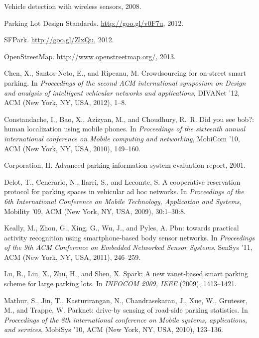 \documentclass{sigchi}
\begin{document}
\balance
{\footnotesize
\begin{thebibliography}{10}

Vehicle detection with wireless sensors, 2008.

{Parking Lot Design Standards}.
\newblock \url{http://goo.gl/v0F7u}, 2012.

{SFPark}.
\newblock \url{http://goo.gl/ZlxQu}, 2012.

{OpenStreetMap}.
\newblock \url{http://www.openstreetmap.org/}, 2013.

Chen, X., Santos-Neto, E., and Ripeanu, M.
\newblock Crowdsourcing for on-street smart parking.
\newblock In {\em Proceedings of the second ACM international symposium on
  Design and analysis of intelligent vehicular networks and applications},
  DIVANet '12, ACM (New York, NY, USA, 2012), 1--8.

Constandache, I., Bao, X., Azizyan, M., and Choudhury, R.~R.
\newblock Did you see bob?: human localization using mobile phones.
\newblock In {\em Proceedings of the sixteenth annual international conference
  on Mobile computing and networking}, MobiCom '10, ACM (New York, NY, USA,
  2010), 149--160.

Corporation, H.
\newblock Advanced parking information system evaluation report, 2001.

Delot, T., Cenerario, N., Ilarri, S., and Lecomte, S.
\newblock A cooperative reservation protocol for parking spaces in vehicular ad
  hoc networks.
\newblock In {\em Proceedings of the 6th International Conference on Mobile
  Technology, Application and Systems}, Mobility '09, ACM (New York, NY, USA,
  2009), 30:1--30:8.

Keally, M., Zhou, G., Xing, G., Wu, J., and Pyles, A.
\newblock Pbn: towards practical activity recognition using smartphone-based
  body sensor networks.
\newblock In {\em Proceedings of the 9th ACM Conference on Embedded Networked
  Sensor Systems}, SenSys '11, ACM (New York, NY, USA, 2011), 246--259.

Lu, R., Lin, X., Zhu, H., and Shen, X.
\newblock Spark: A new vanet-based smart parking scheme for large parking lots.
\newblock In {\em INFOCOM 2009, IEEE} (2009), 1413--1421.

Mathur, S., Jin, T., Kasturirangan, N., Chandrasekaran, J., Xue, W., Gruteser,
  M., and Trappe, W.
\newblock Parknet: drive-by sensing of road-side parking statistics.
\newblock In {\em Proceedings of the 8th international conference on Mobile
  systems, applications, and services}, MobiSys '10, ACM (New York, NY, USA,
  2010), 123--136.


\end{thebibliography}}
\end{document}
